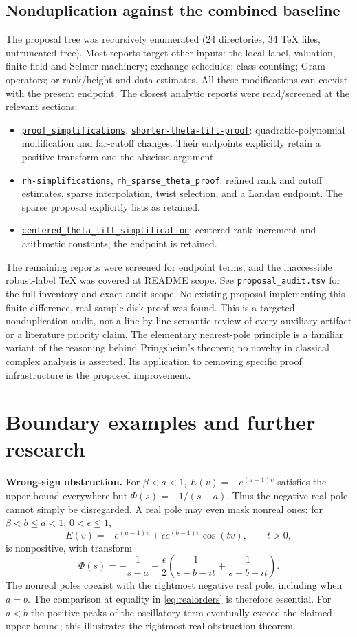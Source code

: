 \documentclass[11pt,letterpaper]{article}
\theoremstyle{remark}\newtheorem{remark}[theorem]{Remark}
\newcommand{\propdir}[1]{\href{https://github.com/VladimirReshetnikov/ProveIt/tree/main/Analysis/GeneralizedRiemannHypothesis/docs/proposals/#1}{\nolinkurl{#1}}}
\newcommand{\decl}[1]{\texttt{\detokenize{#1}}}
\begin{document}
\subsection{Nonduplication against the combined baseline}
The proposal tree was recursively enumerated (24 directories, 34 TeX files, untruncated tree). Most reports target other inputs: the local label, valuation, finite field and Selmer machinery; exchange schedules; class counting; Gram operators; or rank/height and data estimates. All these modifications can coexist with the present endpoint. The closest analytic reports were read/screened at the relevant sections:
\begin{itemize}
\item \propdir{proof_simplifications}, \propdir{shorter-theta-lift-proof}: quadratic-polynomial mollification and far-cutoff changes. Their endpoints explicitly retain a positive transform and the abscissa argument.
\item \propdir{rh-simplifications}, \propdir{rh_sparse_theta_proof}: refined rank and cutoff estimates, sparse interpolation, twist selection, and a Landau endpoint. The sparse proposal explicitly lists \decl{IsPolar.landau} as retained.
\item \propdir{centered_theta_lift_simplification}: centered rank increment and arithmetic constants; the endpoint is retained.
\end{itemize}
The remaining reports were screened for endpoint terms, and the inaccessible robust-label TeX was covered at README scope. See \texttt{proposal\_audit.tsv} for the full inventory and exact audit scope. No existing proposal implementing this finite-difference, real-sample disk proof was found. This is a targeted nonduplication audit, not a line-by-line semantic review of every auxiliary artifact or a literature priority claim. The elementary nearest-pole principle is a familiar variant of the reasoning behind Pringsheim's theorem; no novelty in classical complex analysis is asserted. Its application to removing specific proof infrastructure is the proposed improvement.

\section{Boundary examples and further research}
\textbf{Wrong-sign obstruction.} For $\beta<a<1$, $E(v)=-e^{(a-1)v}$ satisfies the upper bound everywhere but $\Phi(s)=-1/(s-a)$. Thus the negative real pole cannot simply be disregarded. A real pole may even mask nonreal ones: for $\beta<b\le a<1$, $0<\epsilon\le1$,
\[
 E(v)=-e^{(a-1)v}+\epsilon e^{(b-1)v}\cos(tv),\qquad t>0,
\]
is nonpositive, with transform
\[
 \Phi(s)=-\frac1{s-a}+\frac{\epsilon}{2}\left(\frac1{s-b-it}+\frac1{s-b+it}\right).
\]
The nonreal poles coexist with the rightmost negative real pole, including when $a=b$. The comparison at equality in \eqref{eq:realorders} is therefore essential. For $a<b$ the positive peaks of the oscillatory term eventually exceed the claimed upper bound; this illustrates the rightmost-real obstruction theorem.
\end{document}
